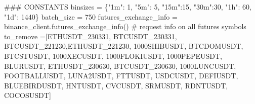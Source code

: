 \documentclass[
  letterpaper,
  DIV=11,
  numbers=noendperiod]{scrartcl}
\newenvironment{Shaded}{\begin{snugshade}}{\end{snugshade}}
\newcommand{\CommentTok}[1]{\textcolor[rgb]{0.37,0.37,0.37}{#1}}
\newcommand{\DecValTok}[1]{\textcolor[rgb]{0.68,0.00,0.00}{#1}}
\newcommand{\NormalTok}[1]{\textcolor[rgb]{0.00,0.23,0.31}{#1}}
\newcommand{\OperatorTok}[1]{\textcolor[rgb]{0.37,0.37,0.37}{#1}}
\newcommand{\StringTok}[1]{\textcolor[rgb]{0.13,0.47,0.30}{#1}}
\begin{document}
\begin{Shaded}
\begin{Highlighting}[]
\CommentTok{\#\#\# CONSTANTS}
\NormalTok{binsizes }\OperatorTok{=}\NormalTok{ \{}\StringTok{"1m"}\NormalTok{: }\DecValTok{1}\NormalTok{, }\StringTok{"5m"}\NormalTok{: }\DecValTok{5}\NormalTok{, }\StringTok{"15m"}\NormalTok{:}\DecValTok{15}\NormalTok{, }\StringTok{"30m"}\NormalTok{:}\DecValTok{30}\NormalTok{, }\StringTok{"1h"}\NormalTok{: }\DecValTok{60}\NormalTok{, }\StringTok{"1d"}\NormalTok{: }\DecValTok{1440}\NormalTok{\}}
\NormalTok{batch\_size }\OperatorTok{=} \DecValTok{750}
\NormalTok{futures\_exchange\_info }\OperatorTok{=}\NormalTok{ binance\_client.futures\_exchange\_info()  }\CommentTok{\# request info on all futures symbols}
\NormalTok{to\_remove }\OperatorTok{=}\NormalTok{[}\StringTok{\textquotesingle{}ETHUSDT\_230331\textquotesingle{}}\NormalTok{, }\StringTok{\textquotesingle{}BTCUSDT\_230331\textquotesingle{}}\NormalTok{, }\StringTok{\textquotesingle{}BTCUSDT\_221230\textquotesingle{}}\NormalTok{,}\StringTok{\textquotesingle{}ETHUSDT\_221230\textquotesingle{}}\NormalTok{, }\StringTok{\textquotesingle{}1000SHIBUSDT\textquotesingle{}}\NormalTok{, }\StringTok{\textquotesingle{}BTCDOMUSDT\textquotesingle{}}\NormalTok{, }\StringTok{\textquotesingle{}BTCSTUSDT\textquotesingle{}}\NormalTok{, }\StringTok{\textquotesingle{}1000XECUSDT\textquotesingle{}}\NormalTok{,  }\StringTok{\textquotesingle{}1000FLOKIUSDT\textquotesingle{}}\NormalTok{, }\StringTok{\textquotesingle{}1000PEPEUSDT\textquotesingle{}}\NormalTok{, }\StringTok{\textquotesingle{}BLURUSDT\textquotesingle{}}\NormalTok{,}
            \StringTok{\textquotesingle{}ETHUSDT\_230630\textquotesingle{}}\NormalTok{, }\StringTok{\textquotesingle{}BTCUSDT\_230630\textquotesingle{}}\NormalTok{, }\StringTok{\textquotesingle{}1000LUNCUSDT\textquotesingle{}}\NormalTok{, }\StringTok{\textquotesingle{}FOOTBALLUSDT\textquotesingle{}}\NormalTok{, }\StringTok{\textquotesingle{}LUNA2USDT\textquotesingle{}}\NormalTok{, }\StringTok{\textquotesingle{}FTTUSDT\textquotesingle{}}\NormalTok{, }\StringTok{\textquotesingle{}USDCUSDT\textquotesingle{}}\NormalTok{, }\StringTok{\textquotesingle{}DEFIUSDT\textquotesingle{}}\NormalTok{, }\StringTok{\textquotesingle{}BLUEBIRDUSDT\textquotesingle{}}\NormalTok{, }\StringTok{\textquotesingle{}HNTUSDT\textquotesingle{}}\NormalTok{, }\StringTok{\textquotesingle{}CVCUSDT\textquotesingle{}}\NormalTok{, }\StringTok{\textquotesingle{}SRMUSDT\textquotesingle{}}\NormalTok{, }\StringTok{\textquotesingle{}RDNTUSDT\textquotesingle{}}\NormalTok{, }\StringTok{\textquotesingle{}COCOSUSDT\textquotesingle{}}\NormalTok{]}
            

\end{Highlighting}
\end{Shaded}
\end{document}
